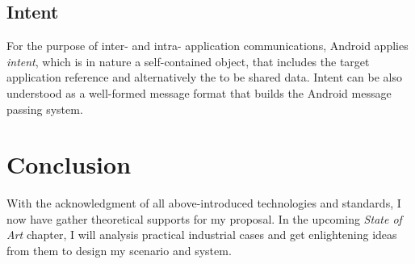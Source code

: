 \subsection{Intent} \label{secIntent}
For the purpose of inter- and intra- application communications, Android applies \emph{intent}, which is in nature a self-contained object, that includes the target application reference and alternatively the to be shared data.  Intent can be also understood as a well-formed message format that builds the Android message passing system\cite{android_secure_inter}.

\section{Conclusion}
With the acknowledgment of all above-introduced technologies and standards, I now have gather theoretical   supports for my proposal. In the upcoming \emph{State of Art} chapter, I will analysis practical industrial cases and get enlightening ideas from them to design my scenario and system.